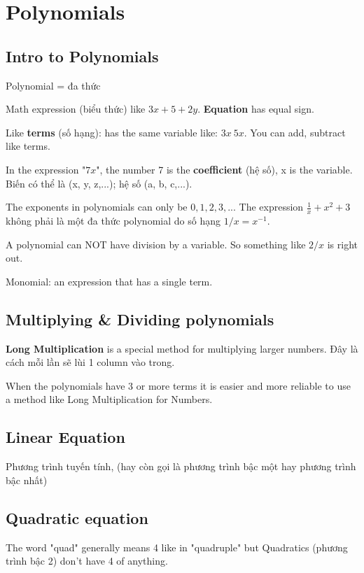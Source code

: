 \chapter{Polynomials}

\section{Intro to Polynomials}

Polynomial = đa thức

Math expression (biểu thức) like \(3x + 5 + 2y\). \textbf{Equation} has equal sign.

Like \textbf{terms} (số hạng): has the same variable like: \(3x\ 5x\). You can add, subtract like terms.

In the expression "\(7x\)", the number 7 is the \textbf{coefficient} (hệ số), x is the variable. Biến có thể là (x, y, z,...); hệ số (a, b, c,...).

The exponents in polynomials can only be $0,1,2,3,...$ The expression $\frac{1}{x} + x^{2} + 3$ không phải là một đa thức polynomial do số hạng $1/x=x^{-1}$.

A polynomial can NOT have division by a variable. So something like $2/x$ is right out.

Monomial: an expression that has a single term.

\section{Multiplying \& Dividing polynomials}

\textbf{Long Multiplication} is a special method for multiplying larger numbers. Đây là cách  mỗi lần sẽ lùi 1 column vào trong.

When the polynomials have 3 or more terms it is easier and more reliable to use a method like Long Multiplication for Numbers.

\section{Linear Equation}

Phương trình tuyến tính, (hay còn gọi là phương trình bậc một hay phương trình bậc nhất)

\section{Quadratic equation}

The word "quad" generally means 4 like in "quadruple" but Quadratics (phương trình bậc 2) don't have 4 of anything.


